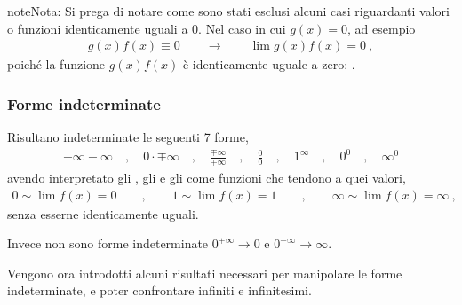 \documentclass[letterpaper,10pt,italian]{jupyterBook}
\begin{document}
\begin{sphinxadmonition}{note}{Nota:}
\sphinxAtStartPar
Si prega di notare come sono stati esclusi alcuni casi riguardanti valori o funzioni identicamente uguali a \(0\). Nel caso in cui \(g(x) = 0\), ad esempio
\begin{equation*}
\begin{split}g(x) f(x) \equiv 0 \qquad \rightarrow \qquad \lim g(x) f(x) = 0 \ ,\end{split}
\end{equation*}
\sphinxAtStartPar
poiché la funzione \(g(x) f(x)\) è identicamente uguale a zero: .
\end{sphinxadmonition}


\subsubsection{Forme indeterminate}
\label{\detokenize{ch/infinitesimal_calculus/analysis:forme-indeterminate}}\label{\detokenize{ch/infinitesimal_calculus/analysis:infinitesimal-calculus-limits-thms-infinite-simal-undetermined}}
\sphinxAtStartPar
Risultano indeterminate le seguenti 7 forme,
\begin{equation*}
\begin{split}+\infty-\infty \quad , \quad 0 \cdot \mp \infty \quad , \quad \frac{\mp \infty}{\mp \infty} \quad , \quad \frac{0}{0} \quad , \quad 1^{\infty} \quad , \quad 0^0 \quad , \quad \infty^0\end{split}
\end{equation*}
\sphinxAtStartPar
avendo interpretato gli , gli  e gli  come funzioni che tendono a quei valori,
\begin{equation*}
\begin{split}0 \sim \lim f(x) = 0 \qquad , \qquad  1 \sim \lim f(x) = 1  \qquad , \qquad \infty \sim \lim f(x) = \infty \ ,\end{split}
\end{equation*}
\sphinxAtStartPar
senza esserne identicamente uguali.

\sphinxAtStartPar
{} Invece non sono forme indeterminate \(0^{+\infty} \rightarrow 0\) e \(0^{-\infty} \rightarrow \infty\).

\sphinxAtStartPar
Vengono ora introdotti alcuni risultati necessari per manipolare le forme indeterminate, e poter confrontare infiniti e infinitesimi.
\end{document}
